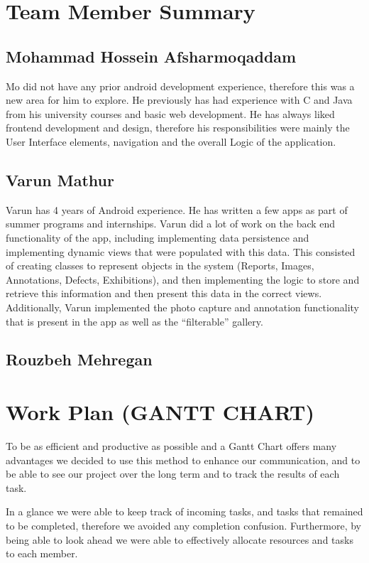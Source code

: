 \documentclass[12pt]{article}
\begin{document}
\newpage
\section{Team Member Summary}

\subsection{Mohammad Hossein Afsharmoqaddam}
Mo did not have any prior android development experience, therefore this was a new area for him to explore. He previously has had experience with C and Java from his university courses and basic web development. He has always liked frontend development and design, therefore his responsibilities were mainly the User Interface elements, navigation and the overall Logic of the application. 

\subsection{Varun Mathur}
Varun has 4 years of Android experience. He has written a few apps as part of summer programs and internships. Varun did a lot of work on the back end functionality of the app, including implementing data persistence and implementing dynamic views that were populated with this data. This consisted of creating classes to represent objects in the system (Reports, Images, Annotations, Defects, Exhibitions), and then implementing the logic to store and retrieve this information and then present this data in the correct views. Additionally, Varun implemented the photo capture and annotation functionality that is present in the app as well as the “filterable” gallery.

\subsection{Rouzbeh Mehregan}





\newpage
\section{Work Plan (GANTT CHART)}
To be as efficient and productive as possible and a Gantt Chart offers many advantages we decided to use this method to enhance our communication, and to be able to see our project over the long term and to track the results of each task. 
\par
In a glance we were able to keep track of incoming tasks, and tasks that remained to be completed, therefore we avoided any completion confusion. Furthermore, by being able to look ahead we were able to effectively allocate resources and tasks to each member. 
\end{document}
